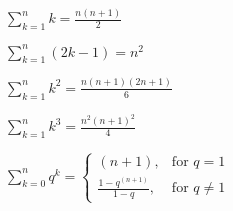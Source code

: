 \begin{multicols}{3}
	
$ \sum_{k=1}^n k = \frac{n(n+1)}{2} $

$ \sum_{k=1}^n (2k-1) = n^2 $

$ \sum_{k=1}^n k^2 = \frac{n(n+1)(2n+1)}{6} $

$ \sum_{k=1}^n k^3 = \frac{n^2(n+1)^2}{4} $

$
\sum_{k=0}^{n}q^k = \begin{cases}
                         (n+1), & \text{for } q=1\\
                         \frac{1-q^{(n+1)}}{1-q}, & \text{for } q\neq1
                    \end{cases}
$
	
\end{multicols}
